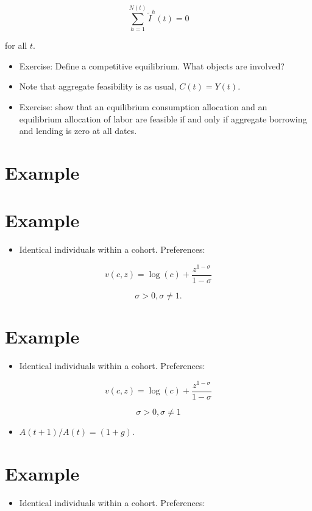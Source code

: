\documentclass[10pt]{article}
\begin{document}
$$
\sum_{h=1}^{N(t)} \tilde{I}^{h}(t)=0
$$

for all $t$.

\begin{itemize}
  \item Exercise: Define a competitive equilibrium. What objects are involved?
  \item Note that aggregate feasibility is as usual, $C(t)=Y(t)$.
  \item Exercise: show that an equilibrium consumption allocation and an equilibrium allocation of labor are feasible if and only if aggregate borrowing and lending is zero at all dates.
\end{itemize}

\section*{Example}
\section*{Example}
\begin{itemize}
  \item Identical individuals within a cohort. Preferences:
\end{itemize}

$$
v(c, z)=\log (c)+\frac{z^{1-\sigma}}{1-\sigma}
$$

$$
\sigma>0, \sigma \neq 1 .
$$

\section*{Example}
\begin{itemize}
  \item Identical individuals within a cohort. Preferences:
\end{itemize}

$$
v(c, z)=\log (c)+\frac{z^{1-\sigma}}{1-\sigma}
$$

$$
\sigma>0, \sigma \neq 1
$$

\begin{itemize}
  \item $A(t+1) / A(t)=(1+g)$.
\end{itemize}

\section*{Example}
\begin{itemize}
  \item Identical individuals within a cohort. Preferences:
\end{itemize}
\end{document}
